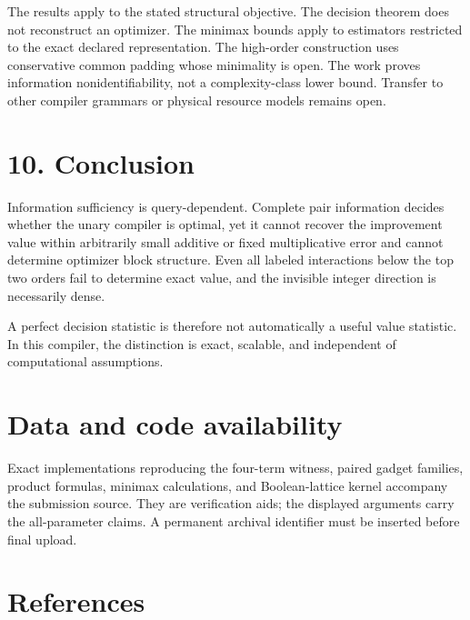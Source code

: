 \documentclass[
  11pt,
]{article}
\begin{document}
The results apply to the stated structural objective. The decision
theorem does not reconstruct an optimizer. The minimax bounds apply to
estimators restricted to the exact declared representation. The
high-order construction uses conservative common padding whose
minimality is open. The work proves information nonidentifiability, not
a complexity-class lower bound. Transfer to other compiler grammars or
physical resource models remains open.

\hypertarget{conclusion}{%
\section{10. Conclusion}\label{conclusion}}

Information sufficiency is query-dependent. Complete pair information
decides whether the unary compiler is optimal, yet it cannot recover the
improvement value within arbitrarily small additive or fixed
multiplicative error and cannot determine optimizer block structure.
Even all labeled interactions below the top two orders fail to determine
exact value, and the invisible integer direction is necessarily dense.

A perfect decision statistic is therefore not automatically a useful
value statistic. In this compiler, the distinction is exact, scalable,
and independent of computational assumptions.

\hypertarget{data-and-code-availability}{%
\section{Data and code availability}\label{data-and-code-availability}}

Exact implementations reproducing the four-term witness, paired gadget
families, product formulas, minimax calculations, and Boolean-lattice
kernel accompany the submission source. They are verification aids; the
displayed arguments carry the all-parameter claims. A permanent archival
identifier must be inserted before final upload.

\hypertarget{references}{%
\section{References}\label{references}}
\end{document}
